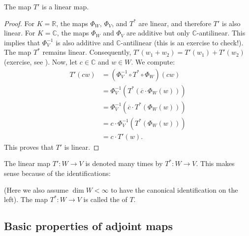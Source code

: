 \begin{claim*}
The map $T'$ is a linear map.
\end{claim*}

\begin{proof}
For $K = \mathbb{R}$, the maps $\Phi_W$, $\Phi_V$, and $T^*$ are linear, and therefore $T'$ is also linear.
For $K = \mathbb{C}$, the maps $\Phi_W$ and $\Phi_V$ are additive but only $\mathbb{C}$-antilinear. This implies that $\Phi_V^{-1}$ is also additive and $\mathbb{C}$-antilinear (this is an exercise to check!).
The map $T^*$ remains linear.
Consequently, $T'(w_1 + w_2) = T'(w_1) + T'(w_2)$ (exercise, see ).\label{exc:additivity_T_prime}
Now, let $c \in \mathbb{C}$ and $w \in W$. We compute:
\begin{align*}
    T'(cw) &= (\Phi_V^{-1} \circ T^* \circ \Phi_W)(cw) \\
    &= \Phi_V^{-1}(T^*(\overline{c} \cdot \Phi_W(w))) \\
    &= \Phi_V^{-1}(\overline{c} \cdot T^*(\Phi_W(w))) \\
    &= c \cdot \Phi_V^{-1}(T^*(\Phi_W(w))) \\
    &= c \cdot T'(w).
\end{align*}
This proves that $T'$ is linear.
\end{proof}

\begin{notation}
The linear map $T' \colon W \to V$ is denoted many times by $T^* \colon W \to V$. This makes sense because of the  identifications:
\begin{center}
\end{center}
(Here we also assume $\dim W < \infty$ to have the canonical identification on the left). The map $T^* \colon W \to V$ is called the  of $T$.
\end{notation}

\subsection*{Basic properties of adjoint maps}


